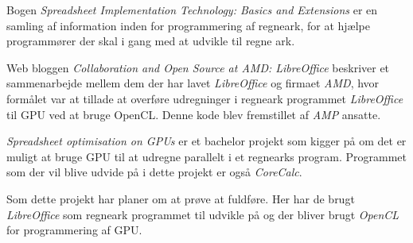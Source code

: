 Bogen \textit{Spreadsheet Implementation Technology: Basics and Extensions}\cite{Spreadsheet_Implementation_Technology} er en samling af information inden for programmering af regneark, for at hjælpe programmører der skal i gang med at udvikle til regne ark.

Web bloggen \textit{Collaboration and Open Source at AMD: LibreOffice} \cite{AMD_LibreOffice} beskriver et sammenarbejde mellem dem der har lavet \textit{LibreOffice} og firmaet \textit{AMD}, hvor formålet var at tillade at overføre udregninger i regneark programmet \textit{LibreOffice} til GPU ved at bruge OpenCL. Denne kode blev fremstillet af \textit{AMP} ansatte.

\textit{Spreadsheet optimisation on GPUs} \cite{GPUP2010} er et bachelor projekt som kigger på om det er muligt at bruge GPU til at udregne parallelt i et regnearks program. Programmet som der vil blive udvide på i dette projekt er også \textit{CoreCalc}.

Som dette projekt har planer om at prøve at fuldføre. Her har de brugt \textit{LibreOffice} som regneark programmet til udvikle på og der bliver brugt \textit{OpenCL} for programmering af GPU.